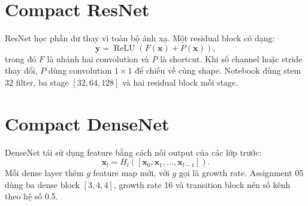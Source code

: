 \documentclass[12pt,a4paper]{report}
\begin{document}
\section{Compact ResNet}
ResNet học phần dư thay vì toàn bộ ánh xạ.
Một residual block có dạng:
\begin{equation}
    \mathbf{y}=\operatorname{ReLU}\left(F(\mathbf{x})+P(\mathbf{x})\right),
\end{equation}
trong đó $F$ là nhánh hai convolution và $P$ là shortcut.
Khi số channel hoặc stride thay đổi, $P$ dùng convolution $1\times1$ để chiếu về cùng shape.
Notebook dùng stem 32 filter, ba stage $[32,64,128]$ và hai residual block mỗi stage.

\section{Compact DenseNet}
DenseNet tái sử dụng feature bằng cách nối output của các lớp trước:
\begin{equation}
    \mathbf{x}_l=H_l\left([\mathbf{x}_0,\mathbf{x}_1,\ldots,\mathbf{x}_{l-1}]\right).
\end{equation}
Mỗi dense layer thêm $g$ feature map mới, với $g$ gọi là growth rate.
Assignment 05 dùng ba dense block $[3,4,4]$, growth rate 16 và transition block nén số kênh theo hệ số 0.5.

\begin{table}[H]
\centering
\caption{Bốn kiến trúc benchmark trong Assignment 05}
\label{tab:architectures}
\end{table}

\end{document}
